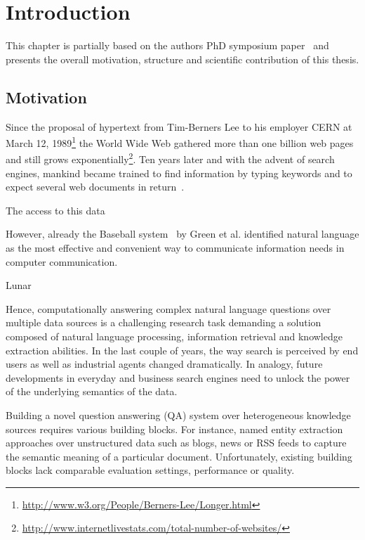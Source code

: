 \chapter{Introduction}
This chapter is partially based on the authors PhD symposium paper~\cite{combiningLDandIR} and presents the overall motivation, structure and scientific contribution of this thesis.

\section{Motivation}
Since the proposal of hypertext from Tim-Berners Lee to his employer CERN at March 12, 1989\footnote{\url{http://www.w3.org/People/Berners-Lee/Longer.html}} the World Wide Web gathered more than one billion web pages and still grows exponentially\footnote{\url{http://www.internetlivestats.com/total-number-of-websites/}}.
Ten years later and with the advent of search engines, mankind became trained to find information by typing keywords and to expect several web documents in return~\cite{ilprints361}.

The access to this data 


However, already the Baseball system~\cite{green1961baseball} by Green et al. identified natural language as the most effective and convenient way to communicate information needs in computer communication.

Lunar\cite{woods1973progress}


Hence, computationally answering complex natural language questions over multiple data sources is a challenging research task demanding a solution composed of natural language processing, information retrieval and knowledge extraction abilities. 
In the last couple of years, the way search is perceived by end users as well as industrial agents changed dramatically.
In analogy, future developments in everyday and business search engines need to unlock the power of the underlying semantics of the data.

Building a novel question answering (QA) system over heterogeneous knowledge sources requires various building blocks.
For instance, named entity extraction approaches over unstructured data such as blogs, news or RSS feeds to capture the semantic meaning of a particular document.
Unfortunately, existing building blocks lack comparable evaluation settings, performance or quality. 

